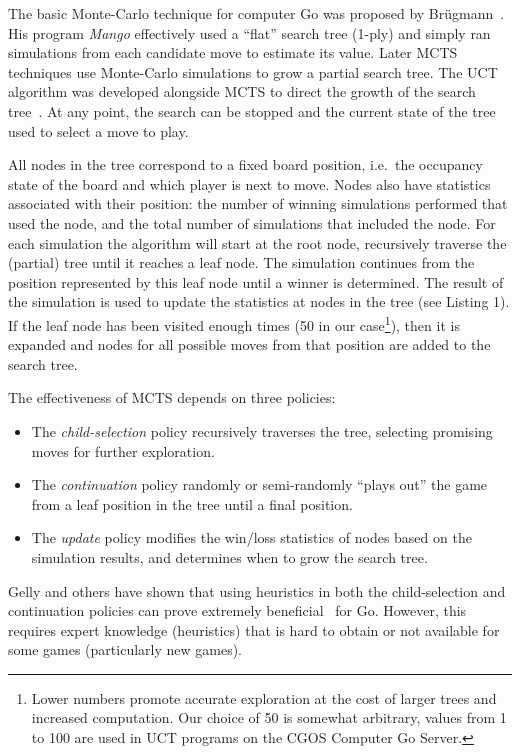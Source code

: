 \documentclass{acm_proc_article-sp}
\begin{document}
The basic Monte-Carlo technique for computer Go was proposed by Br\"{u}gmann~\cite{brugmann1993monte}. His program \emph{Mango} effectively used a ``flat'' search tree (1-ply) and simply ran simulations from each candidate move to estimate its value. 
Later MCTS techniques use Monte-Carlo simulations to grow a partial search tree. 
The UCT algorithm was developed alongside MCTS to direct the growth of the search tree~\cite{gelly2006exploration}. 
At any point, the search can be stopped and the current state of the tree used to select a move to play. 


All nodes in the tree correspond to a fixed board position, i.e.~the occupancy state of the board and which player is next to move. 
Nodes also have statistics associated with their position:  the number of winning simulations performed that used the node, and the total number of simulations that included the node. 
For each simulation the algorithm will start at the root node, recursively traverse the (partial) tree until it reaches a leaf node.
The simulation continues from the position represented by this leaf node until a winner is determined.
The result of the simulation is used to update the statistics at nodes in the tree
(see Listing 1).
If the leaf node has been visited enough times (50 in our case\footnote{Lower numbers promote accurate exploration at the cost of larger trees and increased computation. Our choice of 50 is somewhat arbitrary, values from 1 to 100 are used in UCT programs on the CGOS Computer Go Server\cite{cgosbots}.}), then it is expanded and nodes for all possible moves from 
that position are added to the search tree.

The effectiveness of MCTS depends on three policies:
\begin{itemize}
\item{The \emph{child-selection} policy recursively traverses the tree, selecting promising moves for further exploration.}
\item{The \emph{continuation} policy randomly or semi-randomly ``plays out'' the game from a leaf position in the tree until a final position.}
\item{The \emph{update} policy modifies the win/loss statistics of nodes based on the simulation results, and determines when to grow the search tree.}
\end{itemize}

Gelly and others have shown that using heuristics in both the child-selection and continuation policies 
can prove extremely beneficial~\cite{gelly2006modification,gelly2008achieving} for Go.
However, this requires expert knowledge (heuristics) that is hard to obtain or not available for some games (particularly new games). 
\end{document}
